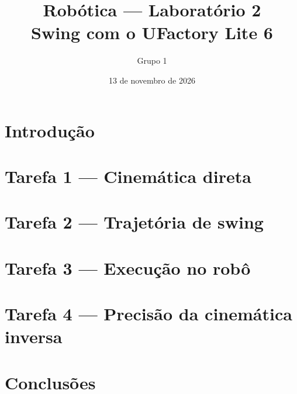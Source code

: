 \documentclass[a4paper,11pt]{article}
\title{Robótica --- Laboratório 2\\\large Swing com o UFactory Lite 6}
\author{Grupo 1}
\date{13 de novembro de 2026}
\begin{document}
\maketitle

\section{Introdução}

\section{Tarefa 1 --- Cinemática direta}

\section{Tarefa 2 --- Trajetória de swing}

\section{Tarefa 3 --- Execução no robô}

\section{Tarefa 4 --- Precisão da cinemática inversa}

\section{Conclusões}
\end{document}
